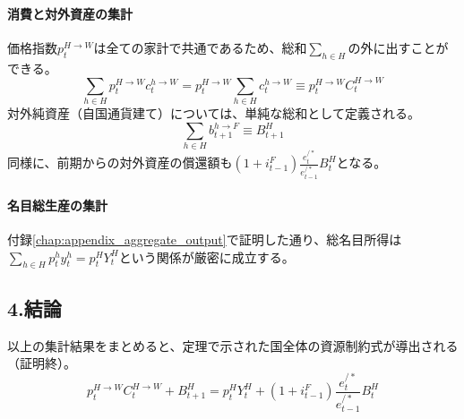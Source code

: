 \paragraph{消費と対外資産の集計}
\label{sec:appendix_resource_constraint_sub3_agg}
価格指数\(p_t^{H\to W}\)は全ての家計で共通であるため、総和\(\sum_{h\in H}\)の外に出すことができる。
\begin{equation}
\label{form:appendix_resource_constraint_sub3_consumption_agg}
\sum_{h\in H}p_t^{H\to W}c_t^{h\to W}=p_t^{H\to W}\sum_{h\in H}c_t^{h\to W}\equiv p_t^{H\to W}C_t^{H\to W}
\end{equation}
対外純資産（自国通貨建て）については、単純な総和として定義される。
\begin{equation}
\label{form:appendix_resource_constraint_sub3_nfa_def}
\sum_{h\in H}b_{t+1}^{h\to F}\equiv B_{t+1}^H
\end{equation}
同様に、前期からの対外資産の償還額も\((1+i_{t-1}^F)\frac{e_t^{/*}}{e_{t-1}^{/*}}B_t^H\)となる。

\paragraph{名目総生産の集計}
\label{sec:appendix_resource_constraint_sub3_gdp}
付録\ref{chap:appendix_aggregate_output}で証明した通り、総名目所得は\(\sum_{h\in H}p_t^hy_t^h=p_t^HY_t^H\)という関係が厳密に成立する。

\subsection*{4.結論}
\label{sec:appendix_resource_constraint_sub4}
以上の集計結果をまとめると、定理で示された国全体の資源制約式が導出される（証明終）。
\begin{equation}
\label{form:appendix_resource_constraint_sub4_final}
p_t^{H\to W}C_t^{H\to W}+B_{t+1}^H=p_t^HY_t^H+(1+i_{t-1}^F)\frac{e_t^{/*}}{e_{t-1}^{/*}}B_t^H
\end{equation}